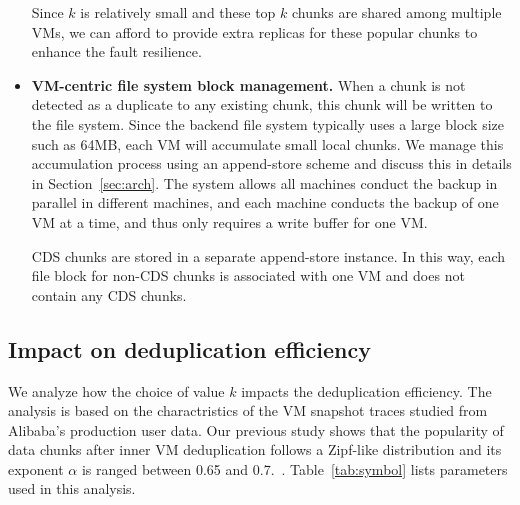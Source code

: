 \begin{itemize}
Since $k$ is relatively small and these top $k$ chunks are shared among multiple VMs, 
we can afford to provide extra replicas for these popular chunks to enhance the fault resilience.

\item \textbf{VM-centric file system block management.}
When a chunk is not detected as a duplicate to any existing chunk, this chunk will be written
to the file system. Since the backend file system typically uses a large block size such as 64MB, each VM will 
accumulate small local chunks. We manage this accumulation process using an append-store  scheme
and discuss this in details in Section~\ref{sec:arch}.
The system allows all machines conduct the backup in parallel in different machines, and each machine
conducts the backup of one VM at a time, and thus only requires a write  buffer for one VM.

CDS chunks are stored in a separate append-store instance. In this way, each
file block for non-CDS chunks is associated with one VM and does not contain
any CDS chunks. 
\end{itemize}

 \subsection{Impact on deduplication efficiency}




We analyze how the choice of value  $k$ impacts the deduplication efficiency.
The analysis is based on the charactristics  of the VM snapshot traces
studied from  Alibaba's production user data.
Our previous study shows that the popularity of data chunks after inner VM deduplication follows 
a Zipf-like distribution\cite{zipf} and its
exponent $\alpha$ is ranged between 0.65  and  0.7.~\cite{ieeecloud}. 
Table~\ref{tab:symbol} lists parameters used in this analysis.


